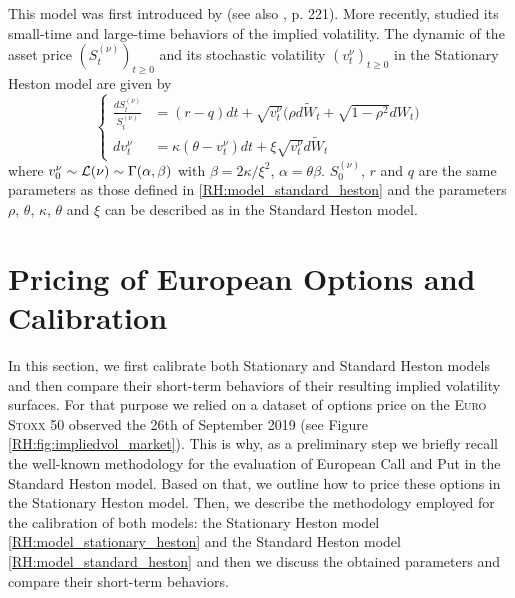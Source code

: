 \smallskip
This model was first introduced by \cite{pages2009approximation} (see also \cite{ikeda1981stochastic}, p. 221). More recently, \cite{jacquier2017randomized} studied its small-time and large-time behaviors of the implied volatility. The dynamic of the asset price $(S_t^{(\nu)})_{t \geq 0}$ and its stochastic volatility $(v_t^{\nu})_{t \geq 0}$ in the Stationary Heston model are given by
\begin{equation} \label{RH:model_stationary_heston}
	\left\{
	\begin{aligned}
		\frac{dS_t^{(\nu)}}{S_t^{(\nu)}} & = (r-q) dt + \sqrt{v_t^{\nu}} \big( \rho d \widetilde W_t + \sqrt{1 - \rho^2} d W_t \big) \\
		dv_t^{\nu}                       & = \kappa (\theta - v_t^{\nu}) dt + \xi \sqrt{v_t^{\nu}} d \widetilde W_t
	\end{aligned}
	\right.
\end{equation}
where $v_0^{\nu} \sim \operatorname{\mathcal{L}} (\nu) \sim \Gamma(\alpha, \beta)$ with $\beta = 2 \kappa / \xi^2$, $\alpha = \theta \beta$. $S_0^{(\nu)}$, $r$ and $q$ are the same parameters as those defined in \eqref{RH:model_standard_heston} and the parameters $\rho$, $\theta$, $\kappa$, $\theta$ and $\xi$ can be described as in the Standard Heston model.





\section{Pricing of European Options and Calibration} \label{RH:section:pricing_calibrationEU}



In this section, we first calibrate both Stationary and Standard Heston models and then compare their short-term behaviors of their resulting implied volatility surfaces. For that purpose we relied on a dataset of options price on the \textsc{Euro Stoxx} 50 observed the 26th of September 2019 (see Figure \ref{RH:fig:impliedvol_market}). This is why, as a preliminary step we briefly recall the well-known methodology for the evaluation of European Call and Put in the Standard Heston model. Based on that, we outline how to price these options in the Stationary Heston model. Then, we describe the methodology employed for the calibration of both models: the Stationary Heston model \eqref{RH:model_stationary_heston} and the Standard Heston model \eqref{RH:model_standard_heston} and then we discuss the obtained parameters and compare their short-term behaviors.

